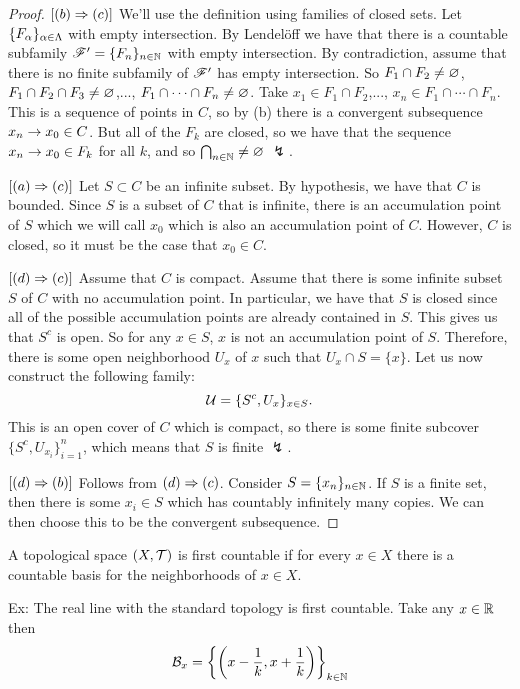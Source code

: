 \begin{proof}
$[(b) \Rightarrow (c)]$ We'll use the definition using families of closed sets. Let $\{F_\alpha\}_{\alpha\in \Lambda}$ with empty intersection. By Lendel\"off we have that there is a countable subfamily $\mathscr{F}^\prime = \{F_n\}_{n\in \mathbb{N}}$ with empty intersection. By contradiction, assume that there is no finite subfamily of $\mathscr{F}^\prime$ has empty intersection. So $F_1\cap F_2 \neq \varnothing$, $F_1\cap F_2\cap F_3 \neq \varnothing$,..., $F_1\cap \cdots\cap F_n\neq \varnothing$. Take $x_1\in F_1\cap F_2$,..., $x_n\in F_1\cap \cdots\cap F_n$. This is a sequence of points in $C$, so by (b) there is a convergent subsequence $x_n\rightarrow x_0\in C$. But all of the $F_k$ are closed, so we have that the sequence $x_n\rightarrow x_0\in F_k$ for all $k$, and so $\bigcap_{n\in \mathbb{N}}\neq \varnothing$ $\lightning$.

$[(a)\Rightarrow (c)]$ Let $S\subset C$ be an infinite subset. By hypothesis, we have that $C$ is bounded. Since $S$ is a subset of $C$ that is infinite, there is an accumulation point of $S$ which we will call $x_0$ which is also an accumulation point of $C$. However, $C$ is closed, so it must be the case that $x_0\in C$.

$[(d) \Rightarrow (c)]$ Assume that $C$ is compact. Assume that there is some infinite subset $S$ of $C$ with no accumulation point. In particular, we have that $S$ is closed since all of the possible accumulation points are already contained in $S$. This gives us that $S^c$ is open. So for any $x\in S$, $x$ is not an accumulation point of $S$. Therefore, there is some open neighborhood $U_x$ of $x$ such that $U_x\cap S = \{x\}$. Let us now construct the following family:
\[\mathcal{U} = \{S^c, U_x\}_{x\in S}.\]
This is an open cover of $C$ which is compact, so there is some finite subcover $\{S^c, U_{x_i}\}_{i = 1}^n$, which means that $S$ is finite $\lightning$.

$[(d)\Rightarrow (b)]$ Follows from $(d) \Rightarrow (c)$. Consider $S = \{x_n\}_{n\in \mathbb{N}}$. If $S$ is a finite set, then there is some $x_i\in S$ which has countably infinitely many copies. We can then choose this to be the convergent subsequence.
\end{proof}

\dfn A topological space $(X, \mathcal{T})$ is first countable if for every $x\in X$ there is a countable basis for the neighborhoods of $x\in X$.

Ex: The real line with the standard topology is first countable. Take any $x\in \mathbb{R}$ then
\[\mathcal{B}_x = \left\{\left( x -\frac{1}{k}, x + \frac{1}{k}\right)\right\}_{k\in \mathbb{N}}\]


